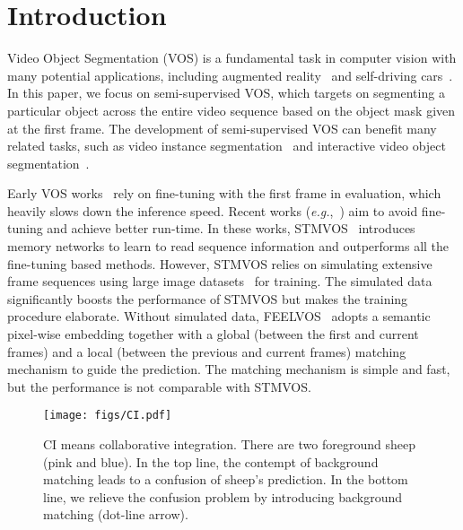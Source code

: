\documentclass[runningheads]{llncs}
\def\eg{\emph{e.g.}}
\newcommand{\zongxin}[1]{#1}
\begin{document}
\section{Introduction}

Video Object Segmentation (VOS) is a fundamental task in computer vision with many potential applications, including augmented reality~\cite{ngan2011video} and self-driving cars~\cite{zhang2016instance}. In this paper, we focus on semi-supervised VOS, which targets on segmenting a particular object across the entire video sequence based on the object mask given at the first frame. 
\zongxin{The development of semi-supervised VOS can benefit many related tasks, such as video instance segmentation~\cite{vis,Feng_2019_ICCV} and interactive video object segmentation~\cite{oh2019fast,miao2020memory,liangmemory}.}

Early VOS works~\cite{osvos,onavos,premvos} rely on fine-tuning with the first frame in evaluation, which heavily slows down the inference speed. Recent works (\eg,~\cite{osmn,feelvos,spacetime}) aim to avoid fine-tuning and achieve better run-time. 
In these works, STMVOS~\cite{spacetime} introduces memory networks to learn to read sequence information and outperforms all the fine-tuning based methods. However, STMVOS relies on simulating extensive frame sequences using large image datasets~\cite{voc,coco,cheng2014global,shi2015hierarchical,semantic} for training. The simulated data significantly boosts the performance of STMVOS but makes the training procedure elaborate. Without simulated data, FEELVOS~\cite{feelvos} adopts a semantic pixel-wise embedding together with a global (between the first and current frames) and a local (between the previous and current frames) matching mechanism to guide the prediction. The matching mechanism is simple and fast, but the performance is not comparable with STMVOS.



\begin{wrapfigure}[17]{R}{0.55\textwidth}
\centering 

\texttt{[image: figs/CI.pdf]}

\caption{CI means collaborative integration. There are two foreground sheep (pink and blue). In the top line, the contempt of background matching leads to a confusion of sheep's prediction. In the bottom line, we relieve the confusion problem by introducing background matching (dot-line arrow).}\label{fig:cl}

\end{wrapfigure}
\end{document}
